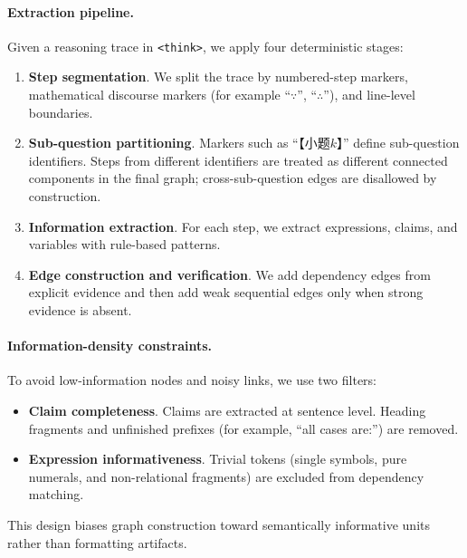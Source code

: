 \paragraph{Extraction pipeline.}
Given a reasoning trace in \texttt{<think>}, we apply four deterministic stages:
\begin{enumerate}[leftmargin=*,itemsep=1pt]
    \item \textbf{Step segmentation}. We split the trace by numbered-step markers, mathematical discourse markers (for example ``$\because$'', ``$\therefore$''), and line-level boundaries.
    \item \textbf{Sub-question partitioning}. Markers such as ``【小题$k$】'' define sub-question identifiers. Steps from different identifiers are treated as different connected components in the final graph; cross-sub-question edges are disallowed by construction.
    \item \textbf{Information extraction}. For each step, we extract expressions, claims, and variables with rule-based patterns.
    \item \textbf{Edge construction and verification}. We add dependency edges from explicit evidence and then add weak sequential edges only when strong evidence is absent.
\end{enumerate}

\paragraph{Information-density constraints.}
To avoid low-information nodes and noisy links, we use two filters:
\begin{itemize}[leftmargin=*,itemsep=1pt]
    \item \textbf{Claim completeness}. Claims are extracted at sentence level. Heading fragments and unfinished prefixes (for example, ``all cases are:'') are removed.
    \item \textbf{Expression informativeness}. Trivial tokens (single symbols, pure numerals, and non-relational fragments) are excluded from dependency matching.
\end{itemize}
This design biases graph construction toward semantically informative units rather than formatting artifacts.

